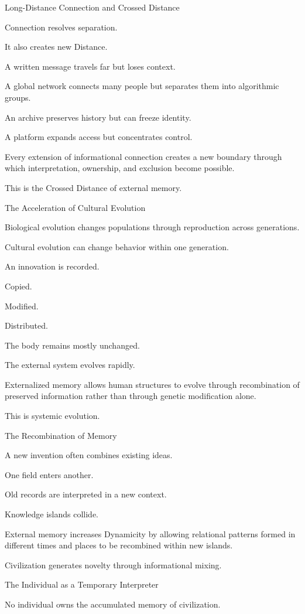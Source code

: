 Long-Distance Connection and Crossed Distance

Connection resolves separation.

It also creates new Distance.

A written message travels far but loses context.

A global network connects many people but separates them into algorithmic groups.

An archive preserves history but can freeze identity.

A platform expands access but concentrates control.

Every extension of informational connection creates a new boundary through which interpretation, ownership, and exclusion become possible.

This is the Crossed Distance of external memory.

The Acceleration of Cultural Evolution

Biological evolution changes populations through reproduction across generations.

Cultural evolution can change behavior within one generation.

An innovation is recorded.

Copied.

Modified.

Distributed.

The body remains mostly unchanged.

The external system evolves rapidly.

Externalized memory allows human structures to evolve through recombination of preserved information rather than through genetic modification alone.

This is systemic evolution.

The Recombination of Memory

A new invention often combines existing ideas.

One field enters another.

Old records are interpreted in a new context.

Knowledge islands collide.

External memory increases Dynamicity by allowing relational patterns formed in different times and places to be recombined within new islands.

Civilization generates novelty through informational mixing.

The Individual as a Temporary Interpreter

No individual owns the accumulated memory of civilization.

